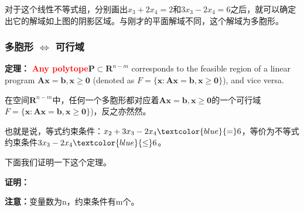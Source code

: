 对于这个线性不等式组，分别画出$x_3 + 2x_4  = 2$和$3x_3 - 2x_4 = 6$之后，就可以确定出它的解域如上图的阴影区域。与刚才的平面解域不同，这个解域为多胞形。
\subsubsection{多胞形 $\Leftrightarrow$ 可行域}

\textbf{定理：}
\textcolor{red}{\bf Any polytope}$\mathbf{P} \subset \mathbf{R}^{n-m}$ corresponds to the feasible region of a linear program $\mathbf{Ax=b, x\geq 0}$ (denoted as $F=\{\mathbf{x: Ax=b, x\geq 0 } \}$), and vice versa.

在空间$\mathbf{R}^{n-m}$中，任何一个多胞形都对应着$\mathbf{Ax=b, x\geq 0}$的一个可行域$F=\{\mathbf{x: Ax=b, x\geq 0 } \}$)，反之亦然然。

也就是说，等式约束条件：$x_2 + 3x_3  - 2x_4  \textcolor{blue}{=}  6$，等价为不等式约束条件$ 3x_3  - 2x_4  \textcolor{blue}{\leq}  6$。

下面我们证明一下这个定理。

\textbf{证明：}

\textbf{注意：}变量数为n，约束条件有m个。

